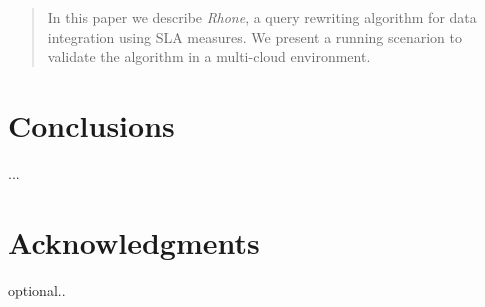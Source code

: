 \documentclass{sig-alternate}
\begin{document}
\maketitle
\begin{abstract}
In this paper we describe \textit{Rhone}, a query rewriting algorithm for data
integration using SLA measures. We present a running scenarion to validate the
algorithm in a multi-cloud environment.
\end{abstract}












\section{Conclusions}
...

\section{Acknowledgments}
optional..

%

\end{document}
